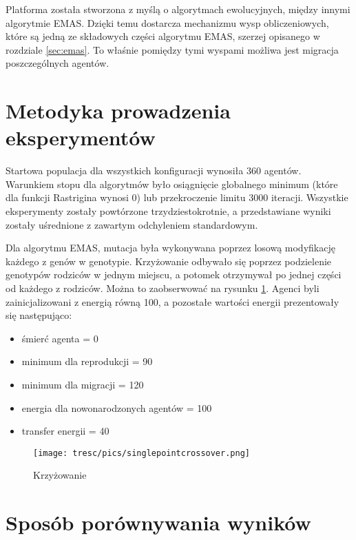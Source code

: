 Platforma została stworzona z myślą o algorytmach ewolucyjnych, między innymi algorytmie EMAS. Dzięki temu dostarcza mechanizmu wysp obliczeniowych, które są jedną ze składowych części algorytmu EMAS, szerzej opisanego w rozdziale \ref{sec:emas}. To właśnie pomiędzy tymi wyspami możliwa jest migracja poszczególnych agentów.

\section{Metodyka prowadzenia eksperymentów}
Startowa populacja dla wszystkich konfiguracji wynosiła 360 agentów. Warunkiem stopu dla algorytmów było osiągnięcie globalnego minimum (które dla funkcji Rastrigina wynosi 0) lub przekroczenie limitu 3000 iteracji. Wszystkie eksperymenty zostały powtórzone trzydziestokrotnie, a przedstawiane wyniki zostały uśrednione z zawartym odchyleniem standardowym.

Dla algorytmu EMAS, mutacja była wykonywana poprzez losową modyfikację każdego z genów w genotypie. Krzyżowanie odbywało się poprzez podzielenie genotypów rodziców w jednym miejscu, a potomek otrzymywał po jednej części od każdego z rodziców. Można to zaobserwować na rysunku \ref{fig:spc}. Agenci byli zainicjalizowani z energią równą 100, a pozostałe wartości energii prezentowały się następująco:

\begin{itemize}
\item śmierć agenta = 0
\item minimum dla reprodukcji = 90
\item minimum dla migracji = 120
\item energia dla nowonarodzonych agentów = 100
\item transfer energii = 40
\end{itemize}


\begin{figure}[H]
\begin{center} 
\texttt{[image: tresc/pics/singlepointcrossover.png]}
\caption{Krzyżowanie}
\label{fig:spc}
\end{center}
\end{figure}

\clearpage

\section{Sposób porównywania wyników}
\label{sec:porownywanieWynikow}

